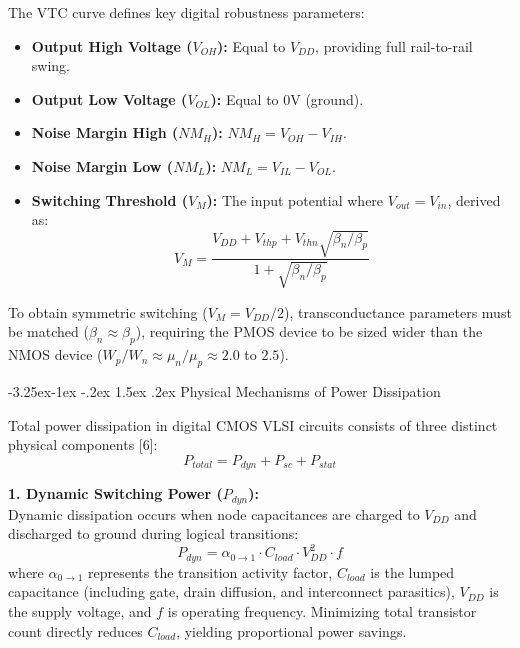 \documentclass[12pt,a4paper,oneside]{report}
\makeatletter
\renewcommand\subsection{\@startsection{subsection}{2}{\z@}%
                                     {-3.25ex\@plus -1ex \@minus -.2ex}%
                                     {1.5ex \@plus .2ex}%
                                     {\normalfont\normalsize\bfseries\itshape}}
\makeatother
\begin{document}
The VTC curve defines key digital robustness parameters:
\begin{itemize}
\item \textbf{Output High Voltage ($V_{OH}$):} Equal to $V_{DD}$, providing full rail-to-rail swing.
\item \textbf{Output Low Voltage ($V_{OL}$):} Equal to $0\text{V}$ (ground).
\item \textbf{Noise Margin High ($NM_H$):} $NM_H = V_{OH} - V_{IH}$.
\item \textbf{Noise Margin Low ($NM_L$):} $NM_L = V_{IL} - V_{OL}$.
\item \textbf{Switching Threshold ($V_M$):} The input potential where $V_{out} = V_{in}$, derived as:
\begin{equation}
V_M = \frac{V_{DD} + V_{thp} + V_{thn}\sqrt{\beta_n/\beta_p}}{1 + \sqrt{\beta_n/\beta_p}}
\label{eq:vm_def}
\end{equation}
\end{itemize}
To obtain symmetric switching ($V_M = V_{DD}/2$), transconductance parameters must be matched ($\beta_n \approx \beta_p$), requiring the PMOS device to be sized wider than the NMOS device ($W_p/W_n \approx \mu_n/\mu_p \approx 2.0$ to $2.5$).

\subsection{Physical Mechanisms of Power Dissipation}

Total power dissipation in digital CMOS VLSI circuits consists of three distinct physical components [6]:
\begin{equation}
P_{total} = P_{dyn} + P_{sc} + P_{stat}
\label{eq:ptot_decomp}
\end{equation}

\noindent\textbf{1. Dynamic Switching Power ($P_{dyn}$):}\\
Dynamic dissipation occurs when node capacitances are charged to $V_{DD}$ and discharged to ground during logical transitions:
\begin{equation}
P_{dyn} = \alpha_{0 \rightarrow 1} \cdot C_{load} \cdot V_{DD}^2 \cdot f
\label{eq:pdyn_form}
\end{equation}
where $\alpha_{0 \rightarrow 1}$ represents the transition activity factor, $C_{load}$ is the lumped capacitance (including gate, drain diffusion, and interconnect parasitics), $V_{DD}$ is the supply voltage, and $f$ is operating frequency. Minimizing total transistor count directly reduces $C_{load}$, yielding proportional power savings.
\end{document}
